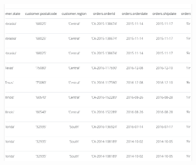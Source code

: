 \begin{center}  
    \includegraphics[width=10cm]{resources/pregunta2/2.4.4.png} \\
\end{center}
    
